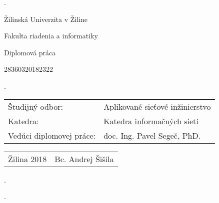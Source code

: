 \begin{titlepage}

\phantom.

\bigskip

\begin{center}
{\sc\LARGE Žilinská Univerzita v Žiline}

\medskip

{\sc\Large Fakulta riadenia a informatiky}

\vspace{4cm}

{\sc\LARGE Diplomová práca}

\medskip

{\large\bf \nazovpraceSK}

\bigskip

28360320182322

\end{center}

\phantom.\hfill
\begin{center}


\begin{tabu} to 1.0 \textwidth { X[4,l] X[8,r] }
 Študijný odbor: & Aplikované sieťové inžinierstvo \\ 
 Katedra: & Katedra informačných sietí \\
 Vedúci diplomovej práce: & doc. Ing. Pavel Segeč, PhD. \\
\end{tabu}

\vspace*{\fill}

\begin{tabu} to 1.0 \textwidth { X[l] X[r] }
 Žilina 2018  & Bc. Andrej Šišila  \\
\end{tabu}

\end{center}
\hspace{1.7cm}\phantom.

\vspace{2.9cm}

\phantom.
\end{titlepage}